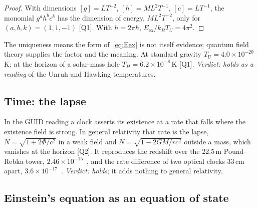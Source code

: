 \documentclass[11pt,a4paper]{article}
\theoremstyle{definition}
\theoremstyle{remark}
\newcommand{\chk}[1]{\textsf{[#1]}}
\theoremstyle{definition}
\begin{document}
\begin{proof}
With dimensions $[g]=LT^{-2}$, $[h]=ML^2T^{-1}$, $[c]=LT^{-1}$, the monomial $g^ah^bc^k$ has the dimension of energy, $ML^2T^{-2}$, only
for $(a,b,k)=(1,1,-1)$ \chk{Q1}. With $h=2\pi\hbar$, $E_{\text{ex}}/k_BT_U=4\pi^2$.
\end{proof}

The uniqueness means the form of~\eqref{eq:Eex} is not itself evidence; quantum field theory supplies the factor and the meaning. At standard
gravity $T_U=4.0\times10^{-20}$\,K; at the horizon of a solar-mass hole $T_H=6.2\times10^{-8}$\,K \chk{Q1}. \emph{Verdict: holds as a
reading} of the Unruh and Hawking temperatures.

\subsection{Time: the lapse}

In the GUID reading a clock asserts its existence at a rate that falls where the existence field is strong. In general relativity that
rate is the lapse, $N=\sqrt{1+2\Phi/c^2}$ in a weak field and $N=\sqrt{1-2GM/rc^2}$ outside a mass, which vanishes at the horizon
\chk{Q2}. It reproduces the redshift over the 22.5\,m Pound--Rebka tower, $2.46\times10^{-15}$~\cite{pr60}, and the rate difference of two
optical clocks 33\,cm apart, $3.6\times10^{-17}$~\cite{chou}. \emph{Verdict: holds}; it adds nothing to general relativity.

\subsection{Einstein's equation as an equation of state}
\end{document}
